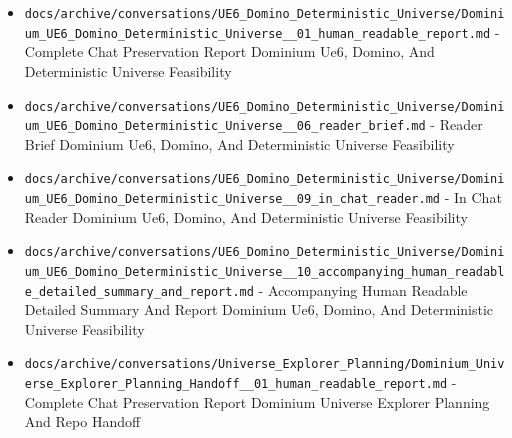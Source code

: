 \documentclass[10.5pt,a4paper,openany]{book}
\begin{document}
\begin{itemize}
\item \texttt{docs/\allowbreak{}archive/\allowbreak{}conversations/\allowbreak{}UE6\_\allowbreak{}Domino\_\allowbreak{}Deterministic\_\allowbreak{}Universe/\allowbreak{}Dominium\_\allowbreak{}UE6\_\allowbreak{}Domino\_\allowbreak{}Deterministic\_\allowbreak{}Universe\_\allowbreak{}\_\allowbreak{}01\_\allowbreak{}human\_\allowbreak{}readable\_\allowbreak{}report.\allowbreak{}md} -\allowbreak{} Complete Chat Preservation Report Dominium Ue6, Domino, And Deterministic Universe Feasibility
\item \texttt{docs/\allowbreak{}archive/\allowbreak{}conversations/\allowbreak{}UE6\_\allowbreak{}Domino\_\allowbreak{}Deterministic\_\allowbreak{}Universe/\allowbreak{}Dominium\_\allowbreak{}UE6\_\allowbreak{}Domino\_\allowbreak{}Deterministic\_\allowbreak{}Universe\_\allowbreak{}\_\allowbreak{}06\_\allowbreak{}reader\_\allowbreak{}brief.\allowbreak{}md} -\allowbreak{} Reader Brief Dominium Ue6, Domino, And Deterministic Universe Feasibility
\item \texttt{docs/\allowbreak{}archive/\allowbreak{}conversations/\allowbreak{}UE6\_\allowbreak{}Domino\_\allowbreak{}Deterministic\_\allowbreak{}Universe/\allowbreak{}Dominium\_\allowbreak{}UE6\_\allowbreak{}Domino\_\allowbreak{}Deterministic\_\allowbreak{}Universe\_\allowbreak{}\_\allowbreak{}09\_\allowbreak{}in\_\allowbreak{}chat\_\allowbreak{}reader.\allowbreak{}md} -\allowbreak{} In Chat Reader Dominium Ue6, Domino, And Deterministic Universe Feasibility
\item \texttt{docs/\allowbreak{}archive/\allowbreak{}conversations/\allowbreak{}UE6\_\allowbreak{}Domino\_\allowbreak{}Deterministic\_\allowbreak{}Universe/\allowbreak{}Dominium\_\allowbreak{}UE6\_\allowbreak{}Domino\_\allowbreak{}Deterministic\_\allowbreak{}Universe\_\allowbreak{}\_\allowbreak{}10\_\allowbreak{}accompanying\_\allowbreak{}human\_\allowbreak{}readable\_\allowbreak{}detailed\_\allowbreak{}summary\_\allowbreak{}and\_\allowbreak{}report.\allowbreak{}md} -\allowbreak{} Accompanying Human Readable Detailed Summary And Report Dominium Ue6, Domino, And Deterministic Universe Feasibility
\item \texttt{docs/\allowbreak{}archive/\allowbreak{}conversations/\allowbreak{}Universe\_\allowbreak{}Explorer\_\allowbreak{}Planning/\allowbreak{}Dominium\_\allowbreak{}Universe\_\allowbreak{}Explorer\_\allowbreak{}Planning\_\allowbreak{}Handoff\_\allowbreak{}\_\allowbreak{}01\_\allowbreak{}human\_\allowbreak{}readable\_\allowbreak{}report.\allowbreak{}md} -\allowbreak{} Complete Chat Preservation Report Dominium Universe Explorer Planning And Repo Handoff

\end{itemize}
\end{document}
